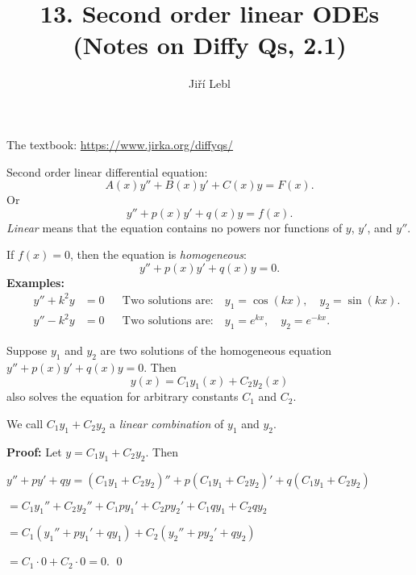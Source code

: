 \documentclass[10pt,aspectratio=169]{beamer}
\author{Ji\v{r}\'i Lebl}
\institute[OSU]{%
Oklahoma State University%
}
\title{13. Second order linear ODEs\\(Notes on Diffy Qs, 2.1)}
\date{}
\begin{document}
\begin{frame}
\titlepage


\begin{center}
The textbook: \url{https://www.jirka.org/diffyqs/}
\end{center}
\end{frame}

\begin{frame}
Second order linear differential equation:
\[
A(x) y'' + B(x)y' + C(x)y = F(x) .
\]
\pause
Or
\[
y'' + p(x)y' + q(x)y = f(x) .
\]
\pause
\emph{Linear} means that the 
equation contains no powers nor
functions of $y$, $y'$, and $y''$.
\medskip
\pause

If $f(x)=0$, then the equation is \emph{homogeneous}:
\[
y'' + p(x)y' + q(x)y = 0 .
\]
\pause
\textbf{Examples:}
\begin{align*}
\qquad y'' + k^2 y & = 0 &
& \text{Two solutions are:} \quad y_1 = \cos (kx), \quad y_2 = \sin(kx) . \qquad \\
\qquad y'' - k^2 y & = 0 &
& \text{Two solutions are:} \quad y_1 = e^{kx}, \quad y_2 = e^{-kx} . \qquad
\end{align*}
\end{frame}

\begin{frame}
\begin{theorem}[Superposition]
Suppose $y_1$ and $y_2$ are two solutions of the
homogeneous equation
$y'' + p(x)y' + q(x)y = 0$.
\pause
Then 
\[
y(x) = C_1 y_1(x) + C_2 y_2(x)
\]
also solves the equation for arbitrary constants $C_1$ and $C_2$.
\end{theorem}
\pause

We call $C_1 y_1 + C_2 y_2$ a \emph{linear combination} of $y_1$ and $y_2$.

\medskip
\pause

\textbf{Proof:}
Let 
$y = C_1 y_1 + C_2 y_2$.  \pause Then

\medskip
$y'' + py' + qy  = (C_1 y_1 + C_2 y_2)'' + p(C_1 y_1 + C_2 y_2)' + q(C_1 y_1
+ C_2 y_2)$

\pause
\phantom{$y'' + py' + qy$}%
${} = C_1 y_1'' + C_2 y_2'' + C_1 p y_1' + C_2 p y_2' + C_1 q y_1 + C_2 q y_2$

\pause
\phantom{$y'' + py' + qy$}%
${} = C_1 ( y_1'' + p y_1' + q y_1 ) + C_2 ( y_2'' + p y_2' + q y_2 )$

\pause
\phantom{$y'' + py' + qy$}%
${} = C_1 \cdot 0 + C_2 \cdot 0 = 0$. \qed

\end{frame}
\end{document}
